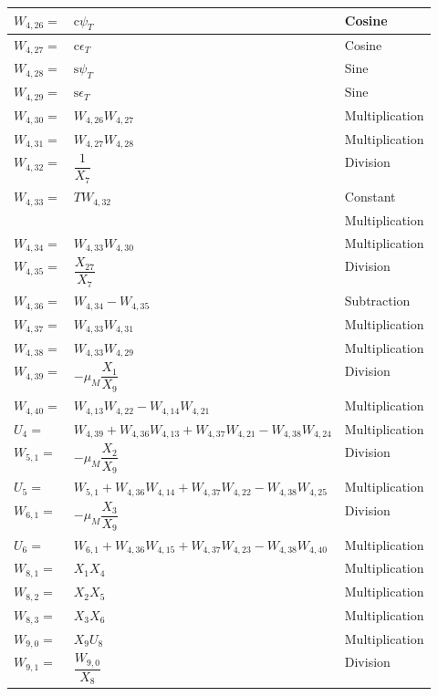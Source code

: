 \begin{longtable}{|p{1.5cm}|l|p{2cm}|}
$W_{4,26}=$ & $ \text{c}\psi_{T} $ & Cosine \\ \hline
$W_{4,27}=$ & $ \text{c}\epsilon_{T} $ & Cosine \\ \hline
$W_{4,28}=$ & $ \text{s}\psi_{T} $ & Sine \\ \hline
$W_{4,29}=$ & $ \text{s}\epsilon_{T} $ & Sine \\ \hline
$W_{4,30}=$ & $ W_{4,26}W_{4,27} $ & Multiplication \\ \hline
$W_{4,31}=$ & $ W_{4,27}W_{4,28} $ & Multiplication \\ \hline
$W_{4,32}=$ & $ \dfrac{1}{X_{7}} $ & Division \\ \hline
$W_{4,33}=$ & $ T W_{4,32} $ & Constant  \\ 
& & Multiplication \\ \hline
$W_{4,34}=$ & $ W_{4,33}W_{4,30} $ & Multiplication \\ \hline
$W_{4,35}=$ & $ \dfrac{X_{27}}{X_{7}} $ & Division \\ \hline
$W_{4,36}=$ & $ W_{4,34}-W_{4,35} $ & Subtraction \\ \hline
$W_{4,37}=$ & $ W_{4,33}W_{4,31} $ & Multiplication \\ \hline
$W_{4,38}=$ & $ W_{4,33}W_{4,29} $ & Multiplication \\ \hline
$W_{4,39}=$ & $ -\mu_{M}\dfrac{X_{1}}{X_{9}} $ & Division \\ \hline
$W_{4,40}=$ & $ W_{4,13}W_{4,22}-W_{4,14}W_{4,21} $ & Multiplication \\ \hline
$U_{4}=$ & $ W_{4,39}+W_{4,36}W_{4,13}+W_{4,37}W_{4,21}-W_{4,38}W_{4,24} $ & Multiplication \\ \hline
$W_{5,1}=$ & $-\mu_{M}\dfrac{X_{2}}{X_{9}}  $ & Division \\ \hline
$U_{5}=$ & $ W_{5,1}+W_{4,36}W_{4,14}+W_{4,37}W_{4,22}-W_{4,38}W_{4,25} $ & Multiplication \\ \hline
$W_{6,1}=$ & $ -\mu_{M}\dfrac{X_{3}}{X_{9}} $ & Division \\ \hline
$U_{6}=$ & $W_{6,1}+W_{4,36}W_{4,15}+W_{4,37}W_{4,23}-W_{4,38}W_{4,40}  $ & Multiplication \\ \hline
$W_{8,1}=$ & $ X_{1}X_{4} $ & Multiplication \\ \hline
$W_{8,2}=$ & $ X_{2}X_{5} $ & Multiplication \\ \hline
$W_{8,3}=$ & $ X_{3}X_{6} $ & Multiplication \\ \hline
$W_{9,0}=$ & $ X_{9}U_{8} $ & Multiplication \\ \hline
$W_{9,1}=$ & $ \dfrac{W_{9,0}}{X_{8}} $ & Division \\ \hline

\end{longtable}
